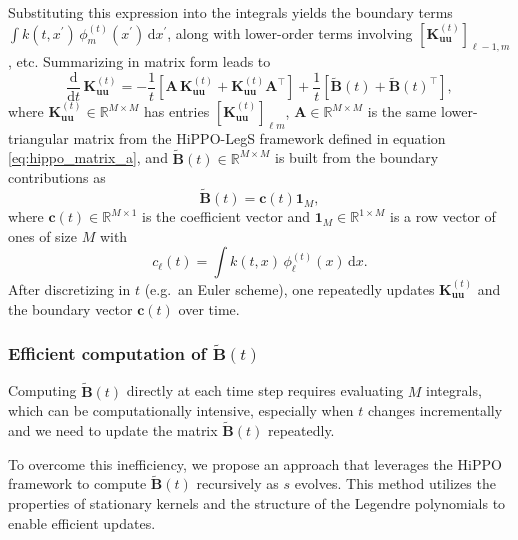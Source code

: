 Substituting this expression into the integrals yields the boundary terms $\int k(t, x^{\prime})\,\phi_{m}^{(t)}(x^{\prime})\,\mathrm{d}x^{\prime}$, along with lower-order terms involving $[\mathbf{K}_{\mathbf{uu}}^{(t)}]_{\ell-1,m}$, etc. Summarizing in matrix form leads to
\begin{equation}
\label{eq:kuu_ode}
\frac{\mathrm{d}}{\mathrm{d}t}\,\mathbf{K}_{\mathbf{uu}}^{(t)}
=
-\frac{1}{t}
\left[
\mathbf{A} \,\mathbf{K}_{\mathbf{uu}}^{(t)}
+
\mathbf{K}_{\mathbf{uu}}^{(t)}\mathbf{A}^\intercal
\right]
+
\frac{1}{t}
\left[
\tilde{\mathbf{B}}(t)+\tilde{\mathbf{B}}(t)^\intercal
\right],
\end{equation}
where $\mathbf{K}_{\mathbf{uu}}^{(t)} \in \mathbb{R}^{M \times M}$ has entries $[\mathbf{K}_{\mathbf{uu}}^{(t)}]_{\ell m}$, $\mathbf{A} \in \mathbb{R}^{M\times M}$ is the same lower-triangular matrix from the HiPPO-LegS framework defined in equation \eqref{eq:hippo_matrix_a}, and $\tilde{\mathbf{B}}(t) \in \mathbb{R}^{M\times M}$ is built from the boundary contributions as
\begin{equation}
\label{eq:boundary_matrix}
\tilde{\mathbf{B}}(t) = \mathbf{c}(t) \mathbf{1}_M,
\end{equation}
where $\mathbf{c}(t) \in \mathbb{R}^{M \times 1}$ is the coefficient vector and $\mathbf{1}_M \in \mathbb{R}^{1\times M}$ is a row vector of ones of size $M$ with
\begin{equation}
    c_{\ell}(t)
    =
    \int\!
    k\left(t, x\right)\,\phi_{\ell}^{(t)}(x)\,\mathrm{d}x.
\end{equation}
After discretizing in $t$ (e.g.\ an Euler scheme), one repeatedly updates $\mathbf{K}_{\mathbf{uu}}^{(t)}$ and the boundary vector $\mathbf{c}(t)$ over time.

\subsubsection{Efficient computation of \( \tilde{\mathbf{B}}(t) \)}

Computing \( \tilde{\mathbf{B}}(t) \) directly at each time step requires evaluating \( M \) integrals, which can be computationally intensive, especially when \( t \) changes incrementally and we need to update the matrix \( \tilde{\mathbf{B}}(t) \) repeatedly.

To overcome this inefficiency, we propose an approach that leverages the HiPPO framework to compute \(\tilde{\mathbf{B}}(t) \) recursively as \( s \) evolves. This method utilizes the properties of stationary kernels and the structure of the Legendre polynomials to enable efficient updates.


